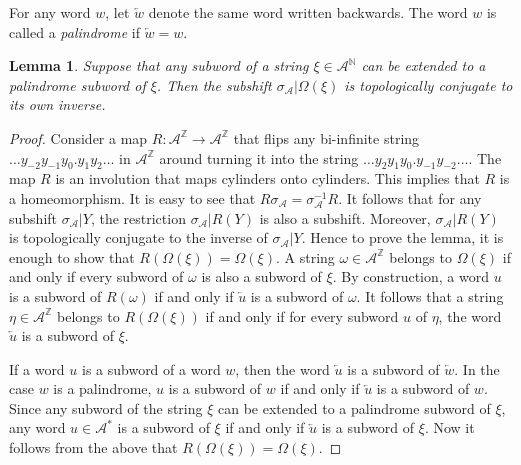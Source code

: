 \documentclass[12pt]{article}
\newtheorem{lemma}[theorem]{Lemma}
\theoremstyle{definition}
\def\bN{\mathbb{N}}
\def\bZ{\mathbb{Z}}
\def\cA{\mathcal{A}}
\def\om{\omega}
\def\si{\sigma}
\def\Om{\Omega}
\begin{document}
For any word $w$, let $\overleftarrow{w}$ denote the same word written 
backwards.  The word $w$ is called a \emph{palindrome} if 
$\overleftarrow{w}=w$.

\begin{lemma}\label{palindrome}
Suppose that any subword of a string $\xi\in\cA^{\bN}$ can be extended to a 
palindrome subword of $\xi$.  Then the subshift $\si_{\cA}|\Om(\xi)$ is 
topologically conjugate to its own inverse.
\end{lemma}

\begin{proof}
Consider a map $R:\cA^{\bZ}\to\cA^{\bZ}$ that flips any bi-infinite string 
$\ldots y_{-2}y_{-1}y_0.y_1y_2\ldots$ in $\cA^{\bZ}$ around turning it into 
the string $\ldots y_2y_1y_0.y_{-1}y_{-2}\ldots$.  The map $R$ is an 
involution that maps cylinders onto cylinders.  This implies that $R$ is a 
homeomorphism.  It is easy to see that $R\si_{\cA}=\si_{\cA}^{-1}R$.  It 
follows that for any subshift $\si_{\cA}|Y$, the restriction 
$\si_{\cA}|R(Y)$ is also a subshift.  Moreover, $\si_{\cA}|R(Y)$ is 
topologically conjugate to the inverse of $\si_{\cA}|Y$.  Hence to prove 
the lemma, it is enough to show that $R(\Om(\xi))=\Om(\xi)$.  A string 
$\om\in\cA^{\bZ}$ belongs to $\Om(\xi)$ if and only if every subword of 
$\om$ is also a subword of $\xi$.  By construction, a word $u$ is a subword 
of $R(\om)$ if and only if $\overleftarrow{u}$ is a subword of $\om$.  It 
follows that a string $\eta\in\cA^{\bZ}$ belongs to $R(\Om(\xi))$ if and 
only if for every subword $u$ of $\eta$, the word $\overleftarrow{u}$ is a 
subword of $\xi$.

If a word $u$ is a subword of a word $w$, then the word $\overleftarrow{u}$ 
is a subword of $\overleftarrow{w}$.  In the case $w$ is a palindrome, $u$ 
is a subword of $w$ if and only if $\overleftarrow{u}$ is a subword of 
$w$.  Since any subword of the string $\xi$ can be extended to a palindrome 
subword of $\xi$, any word $u\in\cA^*$ is a subword of $\xi$ if and only if 
$\overleftarrow{u}$ is a subword of $\xi$.  Now it follows from the above 
that $R(\Om(\xi))=\Om(\xi)$.
\end{proof}
\end{document}
